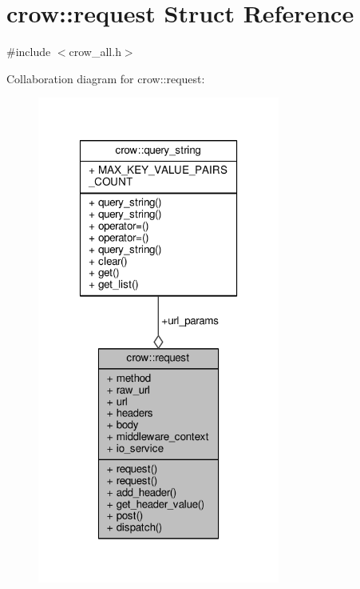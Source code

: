\hypertarget{structcrow_1_1request}{\section{crow\-:\-:request Struct Reference}
\label{structcrow_1_1request}
}


{\ttfamily \#include $<$crow\-\_\-all.\-h$>$}



Collaboration diagram for crow\-:\-:request\-:
\nopagebreak
\begin{figure}[H]
\begin{center}
\leavevmode
\includegraphics[width=226pt]{structcrow_1_1request__coll__graph}
\end{center}
\end{figure}
